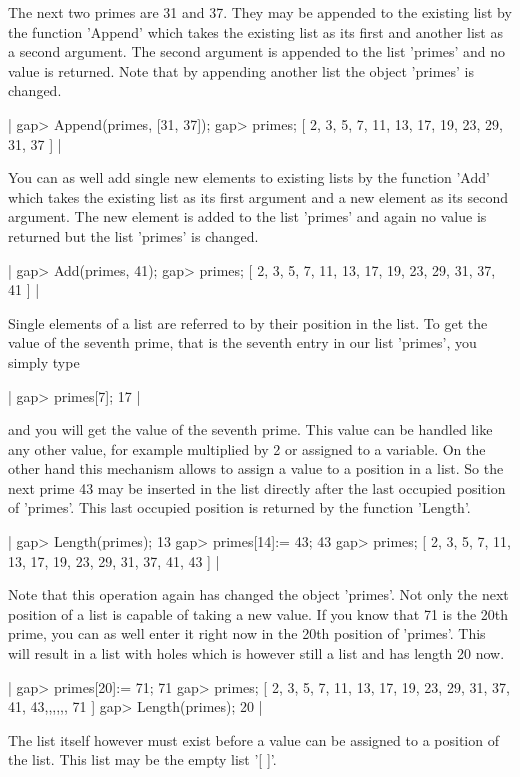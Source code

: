 The next two primes are  31 and 37.  They may be appended to the existing
list by the function 'Append' which takes  the existing list as its first
and another list as a second argument.  The  second argument  is appended
to the list 'primes' and  no  value is returned.  Note that  by appending
another list the object 'primes' is changed.

|    gap> Append(primes, [31, 37]);
    gap> primes;
    [ 2, 3, 5, 7, 11, 13, 17, 19, 23, 29, 31, 37 ] |

You can as well add single new elements to existing lists by the function
'Add'  which takes  the existing list  as its  first argument  and  a new
element as  its second argument.  The  new  element  is added to the list
'primes' and again no value is returned but the list 'primes' is changed.

|    gap> Add(primes, 41);
    gap> primes;
    [ 2, 3, 5, 7, 11, 13, 17, 19, 23, 29, 31, 37, 41 ] |

Single elements of a list are referred to by their position in the  list.
To get the value  of the seventh prime, that is the seventh entry in  our
list 'primes', you simply type

|    gap> primes[7];
    17 |

and you  will get the  value  of the  seventh prime.  This  value  can be
handled like any other value, for example multiplied by 2 or  assigned to
a variable.  On the other hand this mechanism allows to assign a value to
a  position in  a list.  So the next prime 43 may be inserted in the list
directly  after  the  last  occupied  position  of 'primes'.   This  last
occupied position is returned by the function 'Length'.

|    gap> Length(primes);
    13
    gap> primes[14]:= 43;
    43
    gap> primes;
    [ 2, 3, 5, 7, 11, 13, 17, 19, 23, 29, 31, 37, 41, 43 ] |

Note that this operation again has changed the object 'primes'.  Not only
the next position of a list is capable  of taking  a  new  value.  If you
know that 71 is the 20th prime, you can as well enter it right now in the
20th position of 'primes'.   This  will result in a list with holes which
is however still a list and has length 20 now.

|    gap> primes[20]:= 71;
    71
    gap> primes;
    [ 2, 3, 5, 7, 11, 13, 17, 19, 23, 29, 31, 37, 41, 43,,,,,, 71 ]
    gap> Length(primes);
    20 |

The list itself however must  exist before a  value can be  assigned to a
position of the list.  This list may be the empty list '[ ]'.

